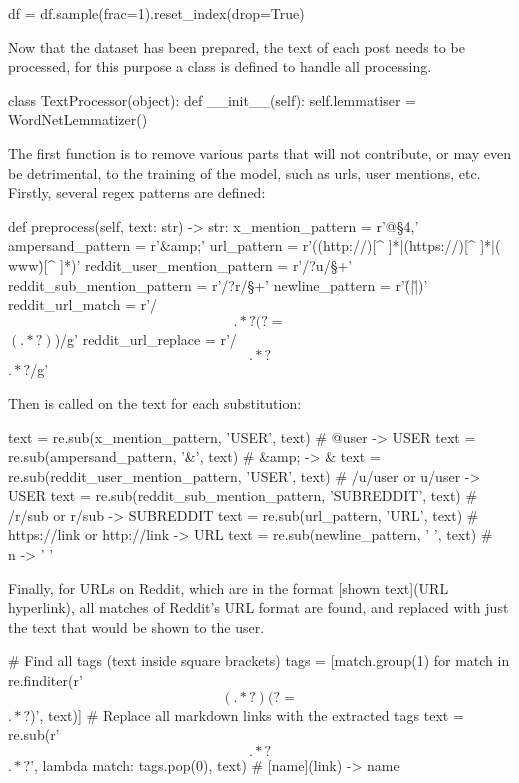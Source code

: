         \begin{python}
df = df.sample(frac=1).reset_index(drop=True)
        \end{python}

        Now that the dataset has been prepared, the text of each post needs to be processed, for this purpose a class  is defined to handle all processing.

        \begin{python}
class TextProcessor(object):
    def __init__(self):
        self.lemmatiser = WordNetLemmatizer()
        \end{python}
        
        The first function  is to remove various parts that will not contribute, or may even be detrimental, to the training of the model, such as urls, user mentions, etc. Firstly, several regex patterns are defined:

        \begin{python}
def preprocess(self, text: str) -> str:
    x_mention_pattern = r'@\S{4,}'
    ampersand_pattern = r'&amp;'
    url_pattern = r'((http://)[^ ]*|(https://)[^ ]*|( www\.)[^ ]*)'
    reddit_user_mention_pattern = r'/?u/\S+'
    reddit_sub_mention_pattern = r'/?r/\S+'
    newline_pattern = r'(\r\n|\r|\n)'
    reddit_url_match = r'/\[.*?(?=\]\((.*?)\))/g'
    reddit_url_replace = r'/\[.*?\]\(.*?\)/g'
        \end{python}

        Then  is called on the text for each substitution:

        \begin{python}
text = re.sub(x_mention_pattern, 'USER', text) # @user -> USER
text = re.sub(ampersand_pattern, '&', text) # &amp; -> &
text = re.sub(reddit_user_mention_pattern, 'USER', text) # /u/user or u/user -> USER
text = re.sub(reddit_sub_mention_pattern, 'SUBREDDIT', text) # /r/sub or r/sub -> SUBREDDIT
text = re.sub(url_pattern, 'URL', text) # https://link or http://link -> URL
text = re.sub(newline_pattern, ' ', text) # \\n -> ' '
        \end{python}

        Finally, for URLs on Reddit, which are in the format [shown text](URL hyperlink), all matches of Reddit's URL format are found, and replaced with just the text that would be shown to the user.

        \begin{python}
# Find all tags (text inside square brackets)
tags = [match.group(1) for match in re.finditer(r'\[(.*?)(?=\]\(.*?\))', text)]
# Replace all markdown links with the extracted tags
text = re.sub(r'\[.*?\]\(.*?\)', lambda match: tags.pop(0), text) # [name](link) -> name
        \end{python}

